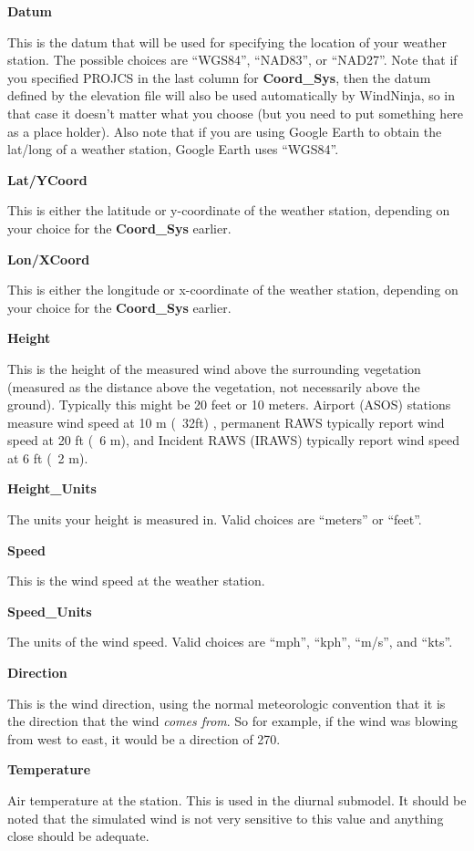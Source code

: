 \documentclass[12pt]{article}
\begin{document}
\textbf{Datum}

This is the datum that will be used for specifying the location of your weather station.  
The possible choices are “WGS84”, “NAD83”, or “NAD27”.  
Note that if you specified PROJCS in the last column for \textbf{Coord\_Sys}, then the datum defined by the elevation file will also be used automatically by WindNinja, so in that case it doesn't matter what you choose (but you need to put something here as a place holder).  
Also note that if you are using Google Earth to obtain the lat/long of a weather station, Google Earth uses “WGS84”.

\textbf{Lat/YCoord}

This is either the latitude or y-coordinate of the weather station, depending on your choice for the \textbf{Coord\_Sys} earlier.

\textbf{Lon/XCoord}

This is either the longitude or x-coordinate of the weather station, depending on your choice for the \textbf{Coord\_Sys} earlier.

\textbf{Height}

This is the height of the measured wind above the surrounding vegetation (measured as the distance above the vegetation, not necessarily above the ground).  
Typically this might be 20 feet or 10 meters. 
Airport (ASOS) stations measure wind speed at 10 m (~32ft) , permanent RAWS typically report wind speed at 20 ft (~6 m), and Incident RAWS (IRAWS) typically report wind speed at 6 ft (~2 m).

\textbf{Height\_Units}

The units your height is measured in.  
Valid choices are “meters” or “feet”.

\textbf{Speed}

This is the wind speed at the weather station.

\textbf{Speed\_Units}

The units of the wind speed.  
Valid choices are “mph”, “kph”, “m/s”, and “kts”.

\textbf{Direction}

This is the wind direction, using the normal meteorologic convention that it is the direction that the wind \textit{comes from}.  
So for example, if the wind was blowing from west to east, it would be a direction of 270.

\textbf{Temperature}

Air temperature at the station.  
This is used in the diurnal submodel.  
It should be noted that the simulated wind is not very sensitive to this value and anything close should be adequate.
\end{document}

